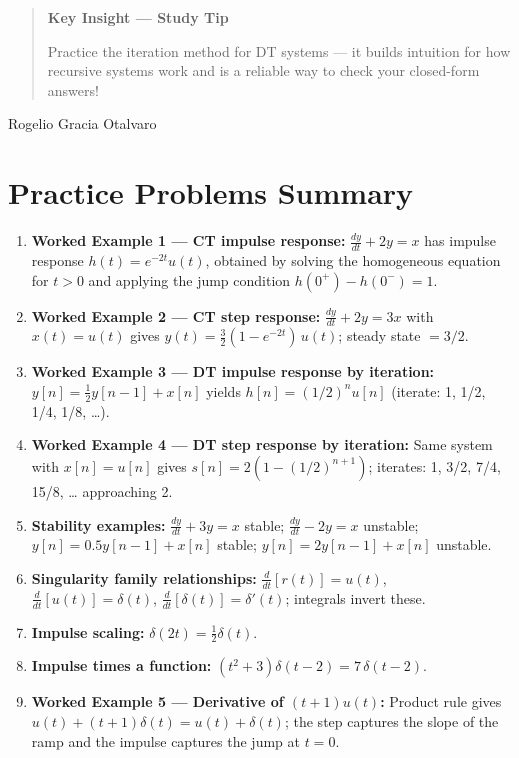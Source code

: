 \documentclass[11pt]{article}
\begin{document}
\begin{quote}
\textbf{Key Insight — Study Tip}

Practice the iteration method for DT systems — it builds intuition for how recursive systems work and is a reliable way to check your closed-form answers!
\end{quote}

Rogelio Gracia Otalvaro

\section*{Practice Problems Summary}

\begin{enumerate}
  \item \textbf{Worked Example 1 — CT impulse response:} $\frac{dy}{dt} + 2y = x$ has impulse response $h(t) = e^{-2t}u(t)$, obtained by solving the homogeneous equation for $t>0$ and applying the jump condition $h(0^+) - h(0^-) = 1$.
  \item \textbf{Worked Example 2 — CT step response:} $\frac{dy}{dt} + 2y = 3x$ with $x(t) = u(t)$ gives $y(t) = \tfrac{3}{2}(1 - e^{-2t})\,u(t)$; steady state $= 3/2$.
  \item \textbf{Worked Example 3 — DT impulse response by iteration:} $y[n] = \tfrac{1}{2}y[n-1] + x[n]$ yields $h[n] = (1/2)^n u[n]$ (iterate: 1, 1/2, 1/4, 1/8, …).
  \item \textbf{Worked Example 4 — DT step response by iteration:} Same system with $x[n] = u[n]$ gives $s[n] = 2(1 - (1/2)^{n+1})$; iterates: 1, 3/2, 7/4, 15/8, … approaching 2.
  \item \textbf{Stability examples:} $\frac{dy}{dt} + 3y = x$ stable; $\frac{dy}{dt} - 2y = x$ unstable; $y[n] = 0.5 y[n-1] + x[n]$ stable; $y[n] = 2 y[n-1] + x[n]$ unstable.
  \item \textbf{Singularity family relationships:} $\frac{d}{dt}[r(t)] = u(t)$, $\frac{d}{dt}[u(t)] = \delta(t)$, $\frac{d}{dt}[\delta(t)] = \delta'(t)$; integrals invert these.
  \item \textbf{Impulse scaling:} $\delta(2t) = \tfrac{1}{2}\delta(t)$.
  \item \textbf{Impulse times a function:} $(t^2 + 3)\delta(t - 2) = 7\,\delta(t - 2)$.
  \item \textbf{Worked Example 5 — Derivative of $(t+1)u(t)$:} Product rule gives $u(t) + (t+1)\delta(t) = u(t) + \delta(t)$; the step captures the slope of the ramp and the impulse captures the jump at $t=0$.
\end{enumerate}
\end{document}
